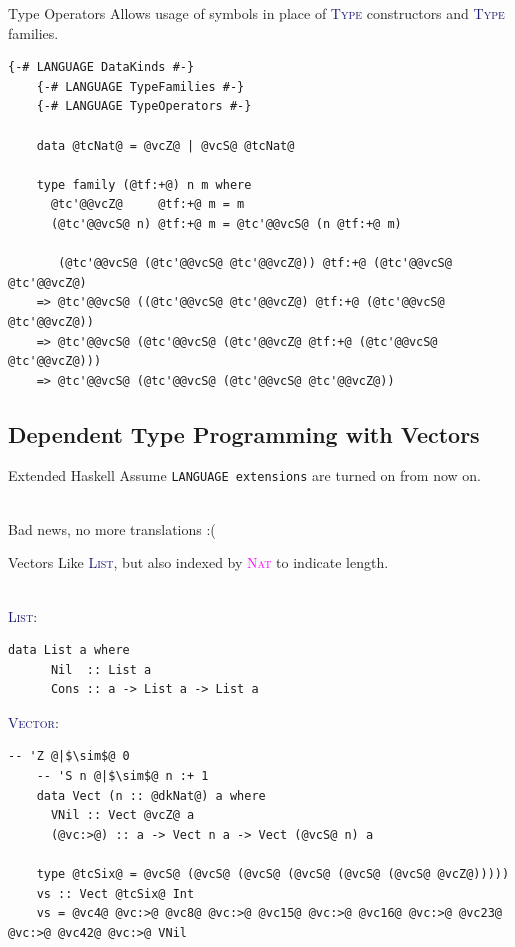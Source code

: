 \documentclass[xcolor={usenames,dvipsnames}]{beamer}
\newcommand{\htycon}[1]{\textcolor{MidnightBlue}{\textsc{#1}}}
\newcommand{\hkind}[1]{\textcolor{Fuchsia}{\textsc{#1}}}
\begin{document}
\begin{frame}[fragile]{Type Operators}
  Allows usage of symbols in place of \htycon{Type} constructors and \htycon{Type} families.

  \begin{lstlisting}[style=hask]
    {-# LANGUAGE DataKinds #-}
    {-# LANGUAGE TypeFamilies #-}
    {-# LANGUAGE TypeOperators #-}

    data @tcNat@ = @vcZ@ | @vcS@ @tcNat@

    type family (@tf:+@) n m where
      @tc'@@vcZ@     @tf:+@ m = m
      (@tc'@@vcS@ n) @tf:+@ m = @tc'@@vcS@ (n @tf:+@ m)

       (@tc'@@vcS@ (@tc'@@vcS@ @tc'@@vcZ@)) @tf:+@ (@tc'@@vcS@ @tc'@@vcZ@)
    => @tc'@@vcS@ ((@tc'@@vcS@ @tc'@@vcZ@) @tf:+@ (@tc'@@vcS@ @tc'@@vcZ@))
    => @tc'@@vcS@ (@tc'@@vcS@ (@tc'@@vcZ@ @tf:+@ (@tc'@@vcS@ @tc'@@vcZ@)))
    => @tc'@@vcS@ (@tc'@@vcS@ (@tc'@@vcS@ @tc'@@vcZ@))
  \end{lstlisting}
\end{frame}


\subsection{Dependent Type Programming with Vectors}

\begin{frame}[fragile]{Extended Haskell}
  Assume \texttt{LANGUAGE extensions} are turned on from now on.

  \ \\
  \pause
  Bad news, no more translations :(
\end{frame}

\begin{frame}[fragile]{Vectors}
  Like \htycon{List}, but also indexed by \hkind{Nat} to indicate length.

  \ \\
  \pause
  \htycon{List}:
  \begin{lstlisting}[style=hask]
    data List a where
      Nil  :: List a
      Cons :: a -> List a -> List a
  \end{lstlisting}

  \pause
  \htycon{Vector}:
  \begin{lstlisting}[style=hask]
    -- 'Z @|$\sim$@ 0
    -- 'S n @|$\sim$@ n :+ 1
    data Vect (n :: @dkNat@) a where
      VNil :: Vect @vcZ@ a
      (@vc:>@) :: a -> Vect n a -> Vect (@vcS@ n) a

    type @tcSix@ = @vcS@ (@vcS@ (@vcS@ (@vcS@ (@vcS@ (@vcS@ @vcZ@)))))
    vs :: Vect @tcSix@ Int
    vs = @vc4@ @vc:>@ @vc8@ @vc:>@ @vc15@ @vc:>@ @vc16@ @vc:>@ @vc23@ @vc:>@ @vc42@ @vc:>@ VNil
  \end{lstlisting}
\end{frame}
\end{document}
